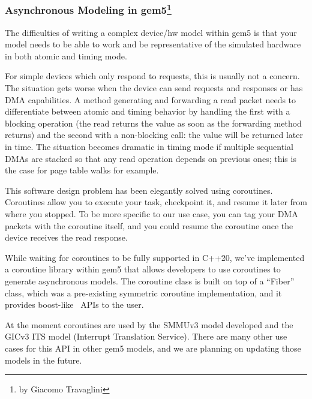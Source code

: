 \subsubsection[Asynchronous Modeling in gem5]{Asynchronous Modeling in gem5\footnote{by Giacomo Travaglini}}

The difficulties of writing a complex device/hw model within gem5 is that your model needs to be able to work and be representative of the simulated hardware in both atomic and timing mode.

For simple devices which only respond to requests, this is usually not a concern.
The situation gets worse when the device can send requests and responses or has DMA capabilities.
A method generating and forwarding a read packet needs to differentiate between atomic and timing behavior by handling the first with a blocking operation (the read returns the value as soon as the forwarding method returns) and the second with a non-blocking call: the value will be returned later in time.
The situation becomes dramatic in timing mode if multiple sequential DMAs are stacked so that any read operation depends on previous ones; this is the case for page table walks for example.

This software design problem has been elegantly solved using coroutines.
Coroutines allow you to execute your task, checkpoint it, and resume it later from where you stopped.
To be more specific to our use case, you can tag your DMA packets with the coroutine itself, and you could resume the coroutine once the device receives the read response.

While waiting for coroutines to be fully supported in C++20, we've implemented a coroutine library within gem5 that allows developers to use coroutines to generate asynchronous models.
The coroutine class is built on top of a ``Fiber'' class, which was a pre-existing symmetric coroutine implementation, and it provides boost-like~\cite{} APIs to the user.

At the moment coroutines are used by the SMMUv3 model developed and the GICv3 ITS model (Interrupt Translation Service).
There are many other use cases for this API in other gem5 models, and we are planning on updating those models in the future.
